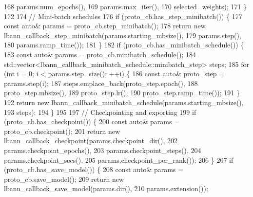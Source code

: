 \begin{DoxyCode}
168                                                  params.num\_epochs(),
169                                                  params.max\_iter(),
170                                                  selected\_weights);
171   \}
172 
174   \textcolor{comment}{// Mini-batch schedules}
176 \textcolor{comment}{}  \textcolor{keywordflow}{if} (proto\_cb.has\_step\_minibatch()) \{
177     \textcolor{keyword}{const} \textcolor{keyword}{auto}& params = proto\_cb.step\_minibatch();
178     \textcolor{keywordflow}{return} \textcolor{keyword}{new} lbann\_callback\_step\_minibatch(params.starting\_mbsize(),
179                                              params.step(),
180                                              params.ramp\_time());
181   \}
182   \textcolor{keywordflow}{if} (proto\_cb.has\_minibatch\_schedule()) \{
183     \textcolor{keyword}{const} \textcolor{keyword}{auto}& params = proto\_cb.minibatch\_schedule();
184     std::vector<lbann\_callback\_minibatch\_schedule::minibatch\_step> steps;
185     \textcolor{keywordflow}{for} (\textcolor{keywordtype}{int} i = 0; i < params.step\_size(); ++i) \{
186       \textcolor{keyword}{const} \textcolor{keyword}{auto}& proto\_step = params.step(i);
187       steps.emplace\_back(proto\_step.epoch(),
188                          proto\_step.mbsize(),
189                          proto\_step.lr(),
190                          proto\_step.ramp\_time());
191     \}
192     \textcolor{keywordflow}{return} \textcolor{keyword}{new} lbann\_callback\_minibatch\_schedule(params.starting\_mbsize(),
193                                                  steps);
194   \}
195 
197   \textcolor{comment}{// Checkpointing and exporting}
199 \textcolor{comment}{}  \textcolor{keywordflow}{if} (proto\_cb.has\_checkpoint()) \{
200     \textcolor{keyword}{const} \textcolor{keyword}{auto}& params = proto\_cb.checkpoint();
201     \textcolor{keywordflow}{return} \textcolor{keyword}{new} lbann\_callback\_checkpoint(params.checkpoint\_dir(),
202                                          params.checkpoint\_epochs(),
203                                          params.checkpoint\_steps(),
204                                          params.checkpoint\_secs(),
205                                          params.checkpoint\_per\_rank());
206   \}
207   \textcolor{keywordflow}{if} (proto\_cb.has\_save\_model()) \{
208     \textcolor{keyword}{const} \textcolor{keyword}{auto}& params = proto\_cb.save\_model();
209     \textcolor{keywordflow}{return} \textcolor{keyword}{new} lbann\_callback\_save\_model(params.dir(),
210                                          params.extension());

\end{DoxyCode}
